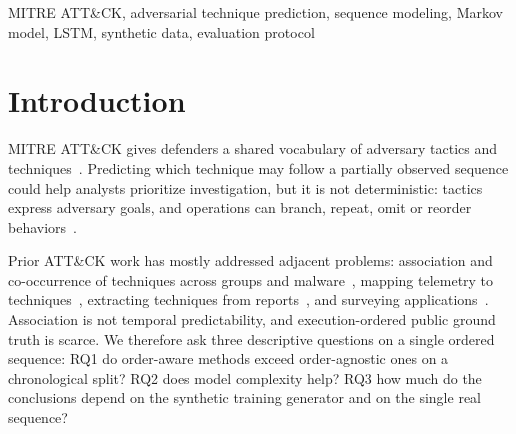 \documentclass[conference]{IEEEtran}
\begin{document}
\begin{abstract}
Ordered public attack traces are scarce, so next-technique forecasting is rarely evaluated against execution order. This pilot benchmark ranks the next MITRE ATT\&CK technique in one ordered sequence reconstructed from the ATT\&CK Evaluations APT29 data (140 steps, 58 distinct technique IDs). Five vendor result files yield identical ordering and are one emulation, not five campaigns. Candidates come from an independent, version-pinned ATT\&CK Enterprise v18.1 catalogue of 835 IDs, not from the sequence. Five methods (global frequency, local co-occurrence, first- and second-order Markov, LSTM) train on 500 heuristic, tactic-constrained synthetic sequences per seed plus the observed context, and are scored by teacher-forced top-$k$ ranking on the last 42 steps after a chronological 98/42 split. Over three seeds, mean top-5 accuracy is 12.7\% for Markov-1, 11.9\% for Markov-2 with backoff, 6.3\% for co-occurrence, 5.6\% for the LSTM and 1.6\% for frequency; uniform random ranking gives 0.6\%. Three further generator policies change the picture: co-occurrence top-5 ranges from 3.2\% to 11.9\% and LSTM top-5 from 0.0\% to 5.6\%, whereas both Markov models stay within 10.3--12.7\%. Differences among the better methods are one to three hits of 42 and are not a stable ranking. These descriptive results come from 42 sequentially dependent positions of one emulation and do not establish cross-campaign or operational prediction capability.
\end{abstract}

\begin{IEEEkeywords}
MITRE ATT\&CK, adversarial technique prediction, sequence modeling, Markov model, LSTM, synthetic data, evaluation protocol
\end{IEEEkeywords}

\section{Introduction}

MITRE ATT\&CK gives defenders a shared vocabulary of adversary tactics and techniques~\cite{roy2023sok}. Predicting which technique may follow a partially observed sequence could help analysts prioritize investigation, but it is not deterministic: tactics express adversary goals, and operations can branch, repeat, omit or reorder behaviors~\cite{mitre_tactics}.

Prior ATT\&CK work has mostly addressed adjacent problems: association and co-occurrence of techniques across groups and malware~\cite{alshaer2020,erfan2026}, mapping telemetry to techniques~\cite{lupinacci2026}, extracting techniques from reports~\cite{fayyazi2023,haque2026}, and surveying applications~\cite{roy2023sok,jiang2025}. Association is not temporal predictability, and execution-ordered public ground truth is scarce. We therefore ask three descriptive questions on a single ordered sequence: RQ1 do order-aware methods exceed order-agnostic ones on a chronological split? RQ2 does model complexity help? RQ3 how much do the conclusions depend on the synthetic training generator and on the single real sequence?
\end{document}
